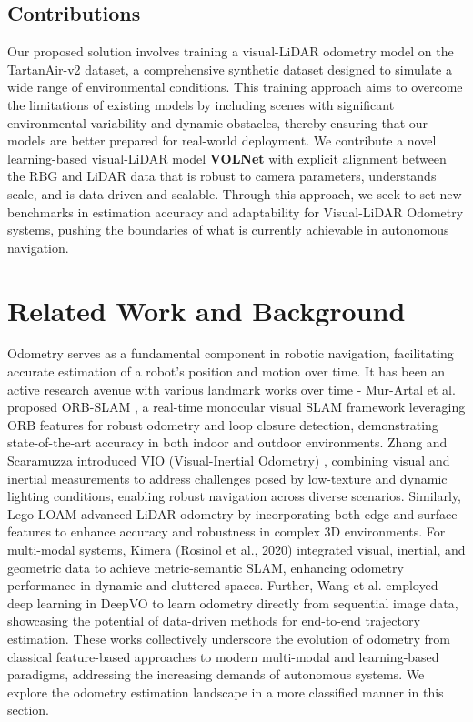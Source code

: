 \documentclass[11pt,a4paper]{article}
\begin{document}
\subsection{Contributions}

Our proposed solution involves training a visual-LiDAR odometry model on the TartanAir-v2 dataset, a comprehensive synthetic dataset designed to simulate a wide range of environmental conditions. This training approach aims to overcome the limitations of existing models by including scenes with significant environmental variability and dynamic obstacles, thereby ensuring that our models are better prepared for real-world deployment. We contribute a novel learning-based visual-LiDAR model \textbf{VOLNet} with explicit alignment between the RBG and LiDAR data that is robust to camera parameters, understands scale, and is data-driven and scalable.  Through this approach, we seek to set new benchmarks in estimation accuracy and adaptability for Visual-LiDAR Odometry systems, pushing the boundaries of what is currently achievable in autonomous navigation.


\clearpage
\section{Related Work and Background}

Odometry serves as a fundamental component in robotic navigation, facilitating accurate estimation of a robot’s position and motion over time. It has been an active research avenue with various landmark works over time - 
Mur-Artal et al. proposed ORB-SLAM \cite{orb-slam}, a real-time monocular visual SLAM framework leveraging ORB features for robust odometry and loop closure detection, demonstrating state-of-the-art accuracy in both indoor and outdoor environments. Zhang and Scaramuzza introduced VIO (Visual-Inertial Odometry) \cite{vio}, combining visual and inertial measurements to address challenges posed by low-texture and dynamic lighting conditions, enabling robust navigation across diverse scenarios. Similarly, Lego-LOAM \cite{legoloam} advanced LiDAR odometry by incorporating both edge and surface features to enhance accuracy and robustness in complex 3D environments. For multi-modal systems, Kimera (Rosinol et al., 2020) integrated visual, inertial, and geometric data to achieve metric-semantic SLAM, enhancing odometry performance in dynamic and cluttered spaces. Further, Wang et al. employed deep learning in DeepVO \cite{deepVO} to learn odometry directly from sequential image data, showcasing the potential of data-driven methods for end-to-end trajectory estimation. These works collectively underscore the evolution of odometry from classical feature-based approaches to modern multi-modal and learning-based paradigms, addressing the increasing demands of autonomous systems. We explore the odometry estimation landscape in a more classified manner in this section.
\end{document}
